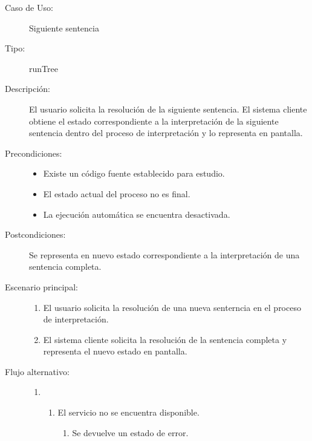\begin{description}
   \item[Caso de Uso:] Siguiente sentencia
   \item [Tipo:] runTree
   \item[Descripción:] 
   El usuario solicita la resolución de la siguiente sentencia. 
   El sistema cliente obtiene el estado correspondiente a la interpretación de la siguiente sentencia 
   dentro del proceso de interpretación y lo representa en pantalla.
  \item[Precondiciones:] \hfill 
   \begin{itemize}
   \item Existe un código fuente establecido para estudio. 
   \item El estado actual del proceso no es final.
   \item La ejecución automática se encuentra desactivada. 
   \end{itemize}
   \item[Postcondiciones:] 
   Se representa en nuevo estado correspondiente a la interpretación de una sentencia completa. 
   \item[Escenario principal:] \hfill
   \begin{enumerate}
   \item El usuario solicita la resolución de una nueva senterncia en el proceso de interpretación.
   \item El sistema cliente solicita la resolución de la sentencia completa y representa
   el nuevo estado en pantalla. 
   \end{enumerate}
   \item[Flujo alternativo:] \hfill 
   \begin{enumerate} \itemsep1pt \parskip0pt 
   \setcounter{enumi}{1}
   \renewcommand{\labelenumi}{}
   \renewcommand{\labelenumiii}{\arabic{enumiii}.}
   \renewcommand{\labelenumii}{\arabic{enumi}\alph{enumii}.}
      \item 
      \begin {enumerate}
         \setcounter{enumii}{0}
         \item El servicio no se encuentra disponible.
         \begin{enumerate}
         \item Se devuelve un estado de error.
         \end{enumerate}
      \end{enumerate}
   \end{enumerate}
\end{description}


